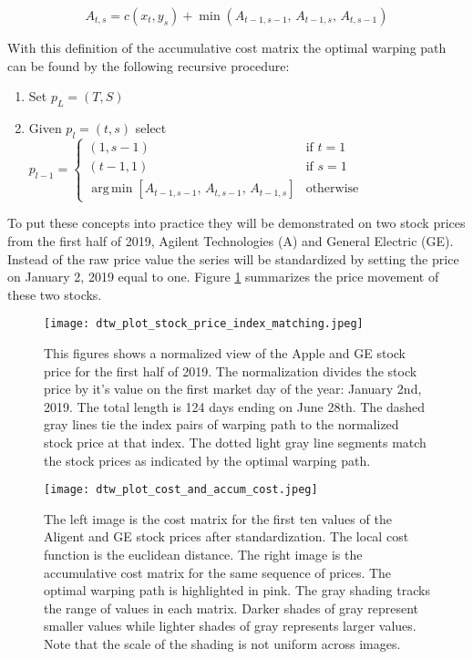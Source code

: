 \documentclass[12pt]{article}
\DeclareMathOperator*{\argmin}{arg\,min}
\begin{document}
\begin{equation}
    A_{t, s} = c(x_{t}, y_{s}) + \min\left(A_{t-1, s-1}, \, A_{t-1, s}, \, A_{t, s-1}\right)
\end{equation}

With this definition of the accumulative cost matrix the optimal warping path can be found by the following recursive procedure:

\begin{enumerate}
    \item Set $p_{L} = (T, S)$
    \item Given $p_{l} = (t, s)$ select $p_{l - 1} = \begin{cases} (1, s-1) & \textrm{if } t=1 \\ (t-1,1) & \textrm{if } s=1 \\ 
                                            \argmin \left[ A_{t-1, s-1},\, A_{t, s-1},\, A_{t-1, s} \right] & \textrm{otherwise} \end{cases}$
\end{enumerate}

To put these concepts into practice they will be demonstrated on two stock prices from the first half of 2019, Agilent Technologies (A) and General Electric (GE). Instead of the raw price value the series will be standardized by setting the price on January 2, 2019 equal to one. Figure \ref{fig:dtw_plot_stock_price_index_matching} summarizes the price movement of these two stocks.

\begin{figure}
    \centering
    \texttt{[image: dtw\_plot\_stock\_price\_index\_matching.jpeg]}
    \caption{This figures shows a normalized view of the Apple and GE stock price for the first half of 2019. The normalization divides the stock price by it's value on the first market day of the year: January 2nd, 2019. The total length is 124 days ending on June 28th. The dashed gray lines tie the index pairs of warping path to the normalized stock price at that index. The dotted light gray line segments match the stock prices as indicated by the optimal warping path.}
    \label{fig:dtw_plot_stock_price_index_matching}
\end{figure}

\begin{figure}
    \centering
    \texttt{[image: dtw\_plot\_cost\_and\_accum\_cost.jpeg]}
    \caption{The left image is the cost matrix for the first ten values of the Aligent and GE stock prices after standardization. The local cost function is the euclidean distance. The right image is the accumulative cost matrix for the same sequence of prices. The optimal warping path is highlighted in pink. The gray shading tracks the range of values in each matrix. Darker shades of gray represent smaller values while lighter shades of gray represents larger values. Note that the scale of the shading is not uniform across images.}
    \label{fig:dtw_plot_cost_and_accum_cost}
\end{figure}
\end{document}
